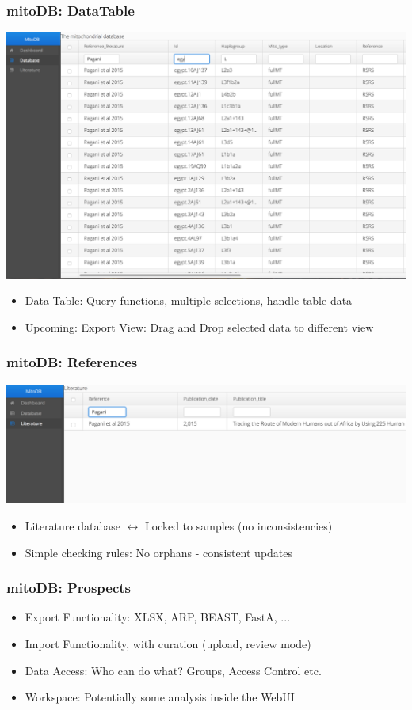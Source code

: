 \documentclass{beamer} %
\begin{document}
\begin{frame}
\frametitle{mitoDB: DataTable}
\centering	
	\includegraphics[scale=0.2]{imagesDB/mitodb_data.png}
\begin{itemize}
\item Data Table: Query functions, multiple selections, handle table data
\item  \textcolor{alexred}{Upcoming:} Export View: Drag and Drop selected data to different view
\end{itemize}
\end{frame}

\begin{frame}
\frametitle{mitoDB: References}
\centering
	\includegraphics[scale=0.25]{imagesDB/mitodb_references.png}
\begin{itemize}
\item Literature database $\leftrightarrow$ Locked to samples (no inconsistencies)
\item Simple checking rules: No orphans - consistent updates 
\end{itemize}
\end{frame}

\begin{frame}
\frametitle{mitoDB: Prospects}
\centering
\begin{itemize}
\item Export Functionality: XLSX, ARP, BEAST, FastA, ... \pause
\item Import Functionality, with curation (upload, review mode) \pause
\item Data Access: Who can do what? Groups, Access Control etc. \pause
\item Workspace: Potentially some analysis inside the WebUI
\end{itemize}
\end{frame}
\end{document}
